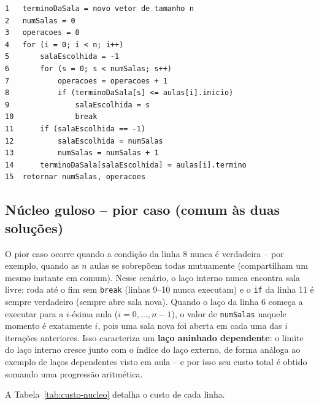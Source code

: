 \documentclass[12pt]{article}
\begin{document}
\begin{verbatim}
1   terminoDaSala = novo vetor de tamanho n
2   numSalas = 0
3   operacoes = 0
4   for (i = 0; i < n; i++)
5       salaEscolhida = -1
6       for (s = 0; s < numSalas; s++)
7           operacoes = operacoes + 1
8           if (terminoDaSala[s] <= aulas[i].inicio)
9               salaEscolhida = s
10              break
11      if (salaEscolhida == -1)
12          salaEscolhida = numSalas
13          numSalas = numSalas + 1
14      terminoDaSala[salaEscolhida] = aulas[i].termino
15  retornar numSalas, operacoes
\end{verbatim}

\subsection{Núcleo guloso -- pior caso (comum às duas soluções)}

O pior caso ocorre quando a condição da linha 8 nunca é verdadeira --
por exemplo, quando as $n$ aulas se sobrepõem todas mutuamente
(compartilham um mesmo instante em comum). Nesse cenário, o laço interno
nunca encontra sala livre: roda até o fim sem \texttt{break} (linhas
9--10 nunca executam) e o \texttt{if} da linha 11 é sempre verdadeiro
(sempre abre sala nova). Quando o laço da linha 6 começa a executar para
a $i$-ésima aula ($i = 0, \dots, n-1$), o valor de \texttt{numSalas}
naquele momento é exatamente $i$, pois uma sala nova foi aberta em cada
uma das $i$ iterações anteriores. Isso caracteriza um \textbf{laço
aninhado dependente}: o limite do laço interno cresce junto com o
índice do laço externo, de forma análoga ao exemplo de laços
dependentes visto em aula -- e por isso seu custo total é obtido somando
uma progressão aritmética.

A Tabela~\ref{tab:custo-nucleo} detalha o custo de cada linha.
\end{document}
